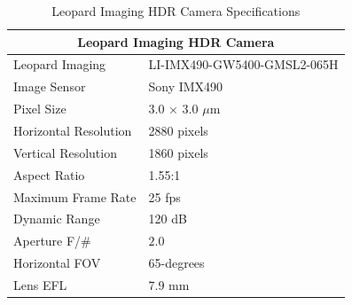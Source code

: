 \documentclass{erauthesis}
\begin{document}

\begin{table}[htpb]
\centering
\caption{Leopard Imaging HDR Camera Specifications}
\begin{tabular}{ll}
\hline
\multicolumn{2}{c}{Leopard Imaging HDR Camera}\\
\hline
\hline
Leopard Imaging & LI-IMX490-GW5400-GMSL2-065H \\
Image Sensor & Sony IMX490 \\
Pixel Size & 3.0 $\times$ 3.0 $\mu$m \\
Horizontal Resolution & 2880 pixels \\
Vertical Resolution & 1860 pixels \\
Aspect Ratio & 1.55:1 \\
Maximum Frame Rate & 25 fps \\
Dynamic Range & 120 dB \\
Aperture F/\# & $2.0$ \\
Horizontal \Ac{FOV} & 65-degrees \\ %
Lens \Ac{EFL} & 7.9 mm\\
\hline
\end{tabular}
\label{table:hdr_camera_specs}
\end{table}



\end{document}
